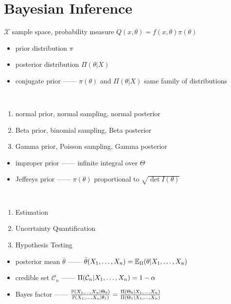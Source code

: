 \section{Bayesian Inference}\label{sec:bayesian-inference}

\begin{setting}
    $\mathcal{X}$ sample space, probability measure $Q(x, \theta) = f(x, \theta)\pi(\theta)$
\end{setting}

\begin{itemize}
    \item prior distribution $\pi$
    \item posterior distribution $\Pi(\theta|X)$
    \item conjugate prior ------ $\pi(\theta)$ and $\Pi(\theta|X)$ same family of distributions
\end{itemize}

\begin{example}\,
\begin{enumerate}
    \item normal prior, normal sampling, normal posterior
    \item Beta prior, binomial sampling, Beta posterior
    \item Gamma prior, Poisson sampling, Gamma posterior
\end{enumerate}
\end{example}

\begin{itemize}
    \item improper prior ------ infinite integral over $\Theta$
    \item Jeffreys prior ------ $\pi(\theta)$ proportional to $\sqrt{\det I(\theta)}$
\end{itemize}

\begin{goal}\,
    \begin{enumerate}
        \item Estimation
        \item Uncertainty Quantification
        \item Hypothesis Testing
    \end{enumerate}
\end{goal}

\begin{itemize}
    \item posterior mean $\bar \theta$ ------ $\bar \theta(\ddd{X}) = \Ex_\Pi(\theta |\ddd{X})$
    \item credible set $\mathcal{C}_n$ ------ $\Pi(\mathcal{C}_n|\ddd{X}) = 1 - \alpha$
    \item Bayes factor ------ $\frac{\Pb(\ddd{X}|\Theta_0)}{\Pb(\ddd{X}|\theta_1)} = \frac{\Pi(\Theta_0|\ddd{X})}{\Pi(\Theta_1|\ddd{X})}$
\end{itemize}

